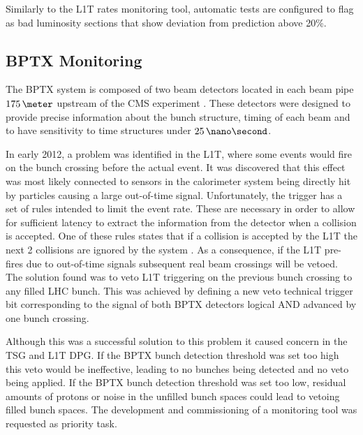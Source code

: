 Similarly to the \gls{L1T} rates monitoring tool, automatic tests are configured to flag as bad luminosity sections that show deviation from prediction above 20\%. 

\subsection{BPTX Monitoring}


The \gls{BPTX} system is composed of two beam detectors located in each beam pipe $175\,\meter$ upstream of the \gls{CMS} experiment \cite{ARTICLE:TheCMSExperiment}. These detectors were designed to provide precise information about the bunch structure, timing of each beam and to have sensitivity to time structures under $25\,\nano\second$. 

In early 2012, a problem was identified in the \gls{L1T}, where some events would fire on the bunch crossing before the actual event. It was discovered that this effect was most likely connected to sensors in the calorimeter system being directly hit by particles causing a large out-of-time signal. Unfortunately, the trigger has a set of rules intended to limit the event rate. These are necessary in order to allow for sufficient latency to extract the information from the detector when a collision is accepted. One of these rules states that if a collision is accepted by the \gls{L1T} the next 2 collisions are ignored by the system \cite{CMSTDR:CMSTridasTDRVol1}. As a consequence, if the \gls{L1T} pre-fires due to out-of-time signals subsequent real beam crossings will be vetoed. The solution found was to veto \gls{L1T} triggering on the previous bunch crossing to any filled \gls{LHC} bunch. This was achieved by defining a new veto technical trigger bit corresponding to the signal of both \gls{BPTX} detectors logical AND advanced by one bunch crossing. 

Although this was a successful solution to this problem it caused concern in the \gls{TSG} and \gls{L1T} \gls{DPG}. If the \gls{BPTX} bunch detection threshold was set too high this veto would be ineffective, leading to no bunches being detected and no veto being applied. If the \gls{BPTX} bunch detection threshold was set too low, residual amounts of protons or noise in the unfilled bunch spaces could lead to vetoing filled bunch spaces. The development and commissioning of a monitoring tool was requested as priority task.

